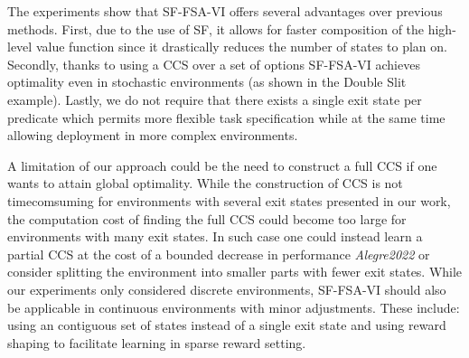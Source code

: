 The experiments show that SF-FSA-VI offers several advantages over previous methods. First, due to the use of SF, it allows for faster composition of the high-level value function since it drastically reduces the number of states to plan on. Secondly, thanks to using a CCS over a set of options SF-FSA-VI achieves optimality even in stochastic environments (as shown in the Double Slit example). Lastly, we do not require that there exists a single exit state per predicate which permits more flexible task specification while at the same time allowing deployment in more complex environments. 

A limitation of our approach could be the need to construct a full CCS if one wants to attain global optimality. While the construction of CCS is not timecomsuming for environments with several exit states presented in our work, the computation cost of finding the full CCS could become too large for environments with many exit states. In such case one could instead learn a partial CCS at the cost of a bounded decrease in performance \textit{Alegre2022} or consider splitting the environment into smaller parts with fewer exit states. While our experiments only considered discrete environments, SF-FSA-VI should also be applicable in continuous environments with minor adjustments. These include: using an contiguous set of states instead of a single exit state and using reward shaping to facilitate learning in sparse reward setting.